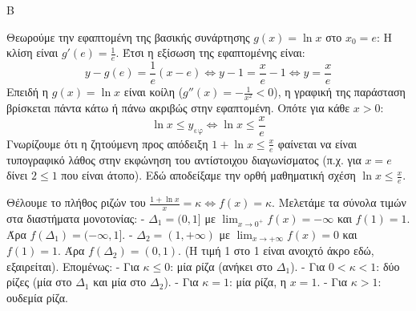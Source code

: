 \begin{thema}{Β}
\begin{erwthma}
\item Θεωρούμε την εφαπτομένη της βασικής συνάρτησης $g(x) = \ln x$ στο $x_0 = e$:
Η κλίση είναι $g'(e) = \frac{1}{e}$. Έτσι η εξίσωση της εφαπτομένης είναι:
\[ y - g(e) = \frac{1}{e}(x - e) \Leftrightarrow y - 1 = \frac{x}{e} - 1 \Leftrightarrow y = \frac{x}{e} \]
Επειδή η $g(x) = \ln x$ είναι κοίλη ($g''(x) = -\frac{1}{x^2} < 0$), η γραφική της παράσταση βρίσκεται πάντα κάτω ή πάνω ακριβώς στην εφαπτομένη. 
Οπότε για κάθε $x > 0$:
\[ \ln x \le y_{\text{εφ}} \Leftrightarrow \ln x \le \frac{x}{e} \]
Γνωρίζουμε ότι η ζητούμενη προς απόδειξη $1+\ln x \le \frac{x}{e}$ φαίνεται να είναι τυπογραφικό λάθος στην εκφώνηση του αντίστοιχου διαγωνίσματος (π.χ. για $x=e$ δίνει $2 \le 1$ που είναι άτοπο). Εδώ αποδείξαμε την ορθή μαθηματική σχέση $\ln x \le \frac{x}{e}$.

\item Θέλουμε το πλήθος ριζών του $\frac{1+\ln x}{x} = \kappa \Leftrightarrow f(x) = \kappa$. 
Μελετάμε τα σύνολα τιμών στα διαστήματα μονοτονίας:
- $\Delta_1 = (0, 1]$ με $\lim_{x\to0^+} f(x) = -\infty$ και $f(1) = 1$. Άρα $f(\Delta_1) = (-\infty, 1]$.
- $\Delta_2 = (1, +\infty)$ με $\lim_{x\to+\infty} f(x) = 0$ και $f(1) = 1$. Άρα $f(\Delta_2) = (0, 1)$. (Η τιμή 1 στο 1 είναι ανοιχτό άκρο εδώ, εξαιρείται).
Επομένως:
- Για $\kappa \le 0$: μία ρίζα (ανήκει στο $\Delta_1$).
- Για $0 < \kappa < 1$: δύο ρίζες (μία στο $\Delta_1$ και μία στο $\Delta_2$).
- Για $\kappa = 1$: μία ρίζα, η $x=1$.
- Για $\kappa > 1$: ουδεμία ρίζα.
\end{erwthma}
\end{thema}
